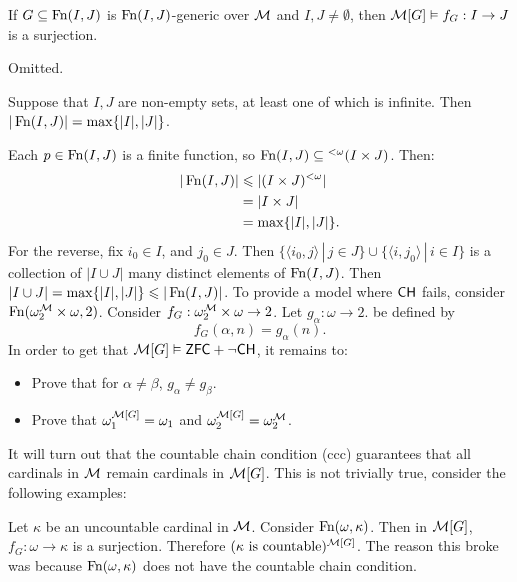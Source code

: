 \documentclass{article}
\begin{document}
    \begin{fancyprop}{}
        If $G \subseteq \operatorname{Fn}(I,J)$ is $\operatorname{Fn}(I,J)$-generic over $\mathcal{M}$ and $I,J \neq \emptyset$, then $\mathcal{M}[G] \vDash f_{G} : I \to J$ is a surjection.
    \end{fancyprop}
    \proof Omitted. \endproof
    \begin{fancyprop}{}
        Suppose that $I,J$ are non-empty sets, at least one of which is infinite. Then $|\operatorname{Fn}(I,J)| = \max\{|I|,|J|\}$.
    \end{fancyprop}
    \proof Each $p \in \operatorname{Fn}(I,J)$ is a finite function, so $\operatorname{Fn}(I,J) \subseteq {} ^{<\omega}(I \times J)$. Then: \begin{align*}
        |\operatorname{Fn}(I,J)| & \leqslant |(I \times J)^{< \omega}| \\
                   & = |I \times J|                 \\
                   & = \max\{|I|,|J|\}.
    \end{align*}
    For the reverse, fix $i_{0} \in I$, and $j_{0} \in J$. Then $\{ \langle i_{0}, j \rangle \, | \, j \in J\} \cup \{ \langle i, j_{0} \rangle \, | \, i \in I\}$ is a collection of $|I \cup J|$ many distinct elements of $\operatorname{Fn}(I,J)$. Then $|I \cup J| = \max\{|I|, |J|\} \leqslant |\operatorname{Fn}(I,J)|$. \endproof
    To provide a model where $\mathsf{CH}$ fails, consider $\operatorname{Fn}(\omega_{2}^{\mathcal{M}} \times \omega, 2)$. Consider $f_{G} : \omega_{2}^{\mathcal{M}} \times \omega \to 2$. Let $g_{\alpha} : \omega \to 2$. be defined by \[ f_{G}(\alpha, n) = g_{\alpha}(n).\]
    In order to get that $\mathcal{M}[G] \vDash \mathsf{ZFC} + \neg \mathsf{CH}$, it remains to:
    \begin{itemize}
        \item Prove that for $\alpha \neq \beta$, $g_{\alpha} \neq g_{\beta}$.
        \item Prove that $\omega_{1}^{\mathcal{M}[G]}=\omega_{1}$ and $\omega_{2}^{\mathcal{M}[G]} = \omega_{2}^{\mathcal{M}}$.
    \end{itemize}
    It will turn out that the countable chain condition (ccc) guarantees that all cardinals in $\mathcal{M}$ remain cardinals in $\mathcal{M}[G]$. This is not trivially true, consider the following examples: \begin{ex*}
        Let $\kappa$ be an uncountable cardinal in $\mathcal{M}$. Consider $\operatorname{Fn}(\omega, \kappa)$. Then in $\mathcal{M}[G]$, $f_{G} : \omega \to \kappa$ is a surjection. Therefore $(\kappa \text{ is countable})^{\mathcal{M}[G]}$. The reason this broke was because $\operatorname{Fn}(\omega, \kappa)$ does not have the countable chain condition.
    \end{ex*}
\end{document}
